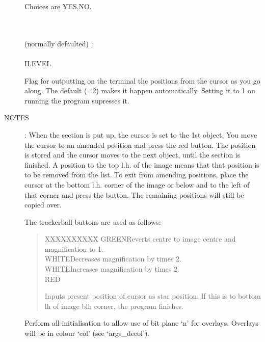 \begin{description}
\begin{tabbing}
\begin{minipage}[t]{100mm}
Choices are YES,NO.
\end{minipage}\\
\\
(normally defaulted) :\\
\\
ILEVEL\>\>\begin{minipage}[t]{100mm}
Flag for outputting on the terminal the positions from the cursor as you go
along.
The default (=2) makes it happen automatically.
Setting it to 1 on running the program supresses it.
\end{minipage}
\end{tabbing}
\item [NOTES]:
When the section is put up, the cursor is set to the 1st object.
You move the cursor to an amended position and press the red button.
The position is stored and the cursor moves to the next object, until the
section is finished.
A position to the top l.h. of the image means that that position is to be
removed from the list.
To exit from amending positions, place the cursor at the bottom l.h. corner of
the image or below and to the left of that corner and press the button.
The remaining positions will still be copied over.

The trackerball buttons are used as follows:
\begin{quote}
\begin{tabbing}
XXXXXX\=XXXX\=\kill
GREEN\>Reverts centre to image centre and magnification to 1.\\
WHITE\>Decreases magnification by times 2.\\
WHITE\>Increases magnification by times 2.\\
RED\>\begin{minipage}[t]{100mm}
Inputs present position of cursor as star position.
If this is to bottom lh of image blh corner, the program finishes.
\end{minipage}
\end{tabbing}
\end{quote}
Perform all initialisation to allow use of bit plane `n' for overlays.
Overlays will be in colour `col' (see `args\_decol').
\end{description}

